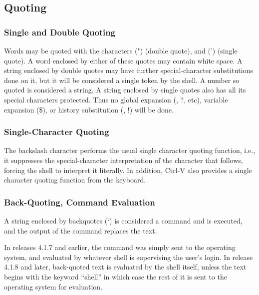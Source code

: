 \subsection{Quoting}


\subsubsection{Single and Double Quoting}

Words may be quoted with the characters ({\vt "}) (double quote), and
({\vt '}) (single quote).  A word enclosed by either of these quotes
may contain white space.  A string enclosed by double quotes may have
further special-character substitutions done on it, but it will be
considered a single token by the shell.  A number so quoted is
considered a string.  A string enclosed by single quotes also has all
its special characters protected.  Thus no global expansion ({\vt *},
{\vt ?}, etc), variable expansion ({\vt \$}), or history substitution
({\vt {}}, {\vt !}) will be done.

\subsubsection{Single-Character Quoting}

The backslash character performs the usual single character quoting
function, i.e., it suppresses the special-character interpretation of
the character that follows, forcing the shell to interpret it
literally.  In addition, {\kb Ctrl-V} also provides a single character
quoting function from the keyboard.

\subsubsection{Back-Quoting, Command Evaluation}

A string enclosed by backquotes ({\vt `}) is considered a command and
is executed, and the output of the command replaces the text.

In releases 4.1.7 and earlier, the command was simply sent to the
operating system, and evaluated by whatever shell is supervising the
user's login.  In release 4.1.8 and later, back-quoted text is
evaluated by the {\WRspice} shell itself, unless the text begins with
the keyword ``{\vt shell}'' in which case the rest of it is sent to
the operating system for evaluation.

